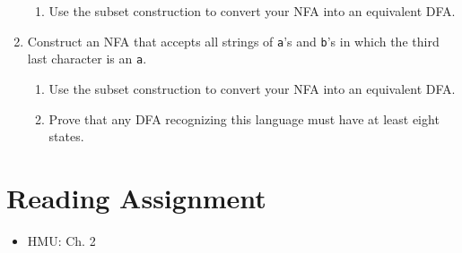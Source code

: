 \documentclass[]{article}
\begin{document}
\begin{enumerate}
\begin{enumerate}
        \item Use the subset construction to convert your NFA into an
        equivalent DFA.
      \end{enumerate}
    \item Construct an NFA that accepts all strings of \texttt{a}'s and
    \texttt{b}'s in which the third last character is an \texttt{a}.
      \begin{enumerate}
        \item Use the subset construction to convert your NFA into an
        equivalent DFA.
        \item Prove that any DFA recognizing this language must have at least
        eight states.
      \end{enumerate}
  \end{enumerate}

\section{Reading Assignment}
  \begin{itemize}
    \item HMU: Ch. 2
  \end{itemize}
\end{document}
